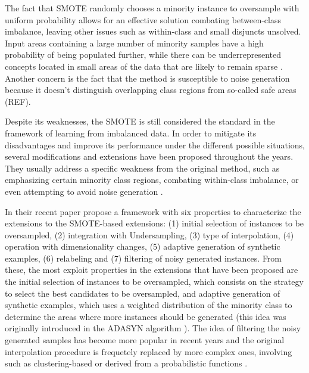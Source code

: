 \documentclass[parskip=full]{scrartcl}
\begin{document}
The fact that SMOTE randomly chooses a minority instance to oversample with 
uniform probability allows for an effective solution combating between-class 
imbalance, leaving other issues such as within-class and small disjuncts 
unsolved. Input areas containing a large number of minority samples have a high 
probability of being populated further, while there can be underrepresented 
concepts located in small areas of the data that are likely to remain sparse 
\cite{Fernandez2018}. Another concern is the fact that the method is 
susceptible to noise generation because it doesn’t distinguish overlapping 
class regions from so-called safe areas (REF).

Despite its weaknesses, the SMOTE is still considered the standard in the 
framework of learning from imbalanced data. In order to mitigate its 
disadvantages and improve its performance under the different possible 
situations, several modifications and extensions have been proposed throughout 
the years. They usually address a specific weakness from the original method, 
such as emphasizing certain minority class regions, combating within-class 
imbalance, or even attempting to avoid noise generation \cite{Douzas2018}.

In their recent paper \cite{Fernandez2018} propose a framework with six 
properties to characterize the extensions to the SMOTE-based extensions: (1) 
initial selection of instances to be oversampled, (2) integration with 
Undersampling, (3) type of interpolation, (4) operation with dimensionality 
changes, (5) adaptive generation of synthetic examples, (6) relabeling and (7) 
filtering of noisy generated instances. From these, the most exploit properties 
in the extensions that have been proposed are the initial selection of 
instances to be oversampled, which consists on the strategy to select the best 
candidates to be oversampled, and adaptive generation of synthetic examples, 
which uses a weighted distribution of the minority class to determine the areas 
where more instances should be generated (this idea was originally introduced 
in the ADASYN algorithm \cite{He2008}). The idea of filtering the noisy 
generated samples has become more popular in recent years and the original 
interpolation procedure is frequetely replaced by more complex ones, involving 
such as clustering-based or derived from a probabilistic functions 
\cite{Fernandez2018}. 
\end{document}
